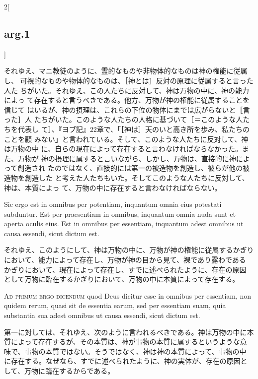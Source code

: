 \documentclass[paper=a4paper,fontsize=10pt,jafontsize=9pt,titlepage]{jlreq}
\begin{document}
\begin{paracol}{2}[\subsection{arg.1}]
\switchcolumn

それゆえ、マニ教徒のように、霊的なものや非物体的なものは神の権能に従属し、
可視的なものや物体的なものは、［神とは］反対の原理に従属すると言った人た
ちがいた。それゆえ、この人たちに反対して、神は万物の中に、神の能力によっ
て存在すると言うべきである。他方、万物が神の権能に従属することを信じて
はいるが、神の摂理は、これらの下位の物体にまでは広がらないと［言った］人
たちがいた。このような人たちの人格に基づいて［＝このような人たちを代表し
て］、『ヨブ記』22章で、「［神は］天のいと高き所を歩み、私たちのことを顧
みない」と言われている。そして、このような人たちに反対して、神は万物の中
に、自らの現在によって存在すると言わなければならなかった。また、万物が
神の摂理に属すると言いながら、しかし、万物は、直接的に神によって創造され
たのではなく、直接的には第一の被造物を創造し、彼らが他の被造物を創造した
と考えた人たちもいた。そしてこのような人たちに反対して、神は、本質によっ
て、万物の中に存在すると言わなければならない。

\switchcolumn*

Sic ergo est in omnibus per potentiam, inquantum omnia eius potestati
 subduntur. Est per praesentiam in omnibus, inquantum omnia nuda sunt et
 aperta oculis eius. Est in omnibus per essentiam, inquantum adest
 omnibus ut causa essendi, sicut dictum est.

\switchcolumn

それゆえ、このようにして、神は万物の中に、万物が神の権能に従属するかぎり
 において、能力によって存在し、万物が神の目から見て、裸であり露わである
 かぎりにおいて、現在によって存在し、すでに述べられたように、存在の原因
 として万物に臨在するかぎりにおいて、万物の中に本質によって存在する。

\switchcolumn*[\subsection{ad.1}]

{\scshape Ad primum ergo dicendum} quod Deus dicitur esse in omnibus per
 essentiam, non quidem rerum, quasi sit de essentia earum, sed per
 essentiam suam, quia substantia sua adest omnibus ut causa essendi,
 sicut dictum est.

\switchcolumn

第一に対しては、それゆえ、次のように言われるべきである。神は万物の中に本
 質によって存在するが、その本質は、神が事物の本質に属するというような意
 味で、事物の本質ではない。そうではなく、神は神の本質によって、事物の中
 に存在する。なぜなら、すでに述べられたように、神の実体が、存在の原因と
 して、万物に臨在するからである。


\end{paracol}
\end{document}
